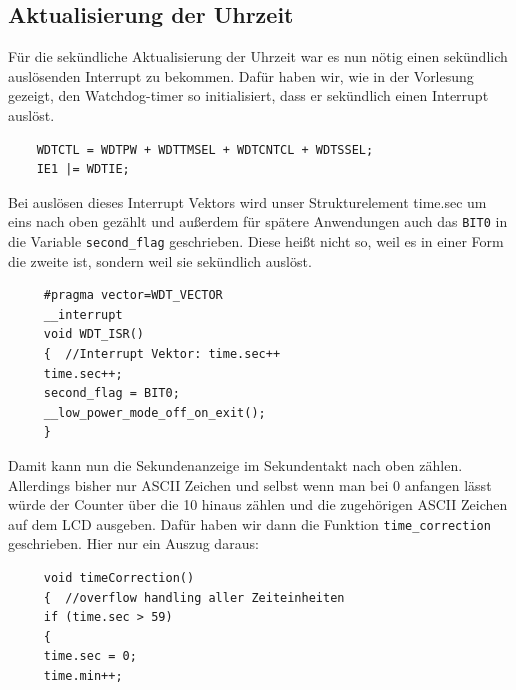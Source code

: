 \documentclass[openright,twoside,11pt,a4paper]{scrartcl}
\begin{document}
\begin{flushleft}
		\section{Aktualisierung der Uhrzeit}
		Für die sekündliche Aktualisierung der Uhrzeit war es nun nötig einen sekündlich auslösenden Interrupt zu bekommen. Dafür haben wir, wie in der Vorlesung gezeigt, den Watchdog-timer so initialisiert, dass er sekündlich einen Interrupt auslöst. 
		\begin{lstlisting}
	WDTCTL = WDTPW + WDTTMSEL + WDTCNTCL + WDTSSEL; 
	IE1 |= WDTIE; 
		\end{lstlisting}
		Bei auslösen dieses Interrupt Vektors wird unser Strukturelement time.sec um eins nach oben gezählt und außerdem für spätere Anwendungen auch das \lstinline[language=C++]|BIT0| in die Variable \lstinline[language=c++]|second_flag| geschrieben. Diese heißt nicht so, weil es in einer Form die zweite ist, sondern weil sie sekündlich auslöst.\newpage
		 \begin{lstlisting}
	 #pragma vector=WDT_VECTOR  
	 __interrupt
	 void WDT_ISR()  
	 {	//Interrupt Vektor: time.sec++
	 time.sec++;
	 second_flag = BIT0;
	 __low_power_mode_off_on_exit();
	 }
		 \end{lstlisting}
		 Damit kann nun die Sekundenanzeige im Sekundentakt nach oben zählen. Allerdings bisher nur ASCII Zeichen und selbst wenn man bei 0 anfangen lässt würde der Counter über die 10 hinaus zählen und die zugehörigen ASCII Zeichen auf dem LCD ausgeben. Dafür haben wir dann die Funktion \lstinline[language=c++]|time_correction| geschrieben. Hier nur ein Auszug daraus:
		 \begin{lstlisting}
	 void timeCorrection()    
	 {	//overflow handling aller Zeiteinheiten
	 if (time.sec > 59)
	 {
	 time.sec = 0;
	 time.min++;
	 

\end{lstlisting}
\end{flushleft}
\end{document}

